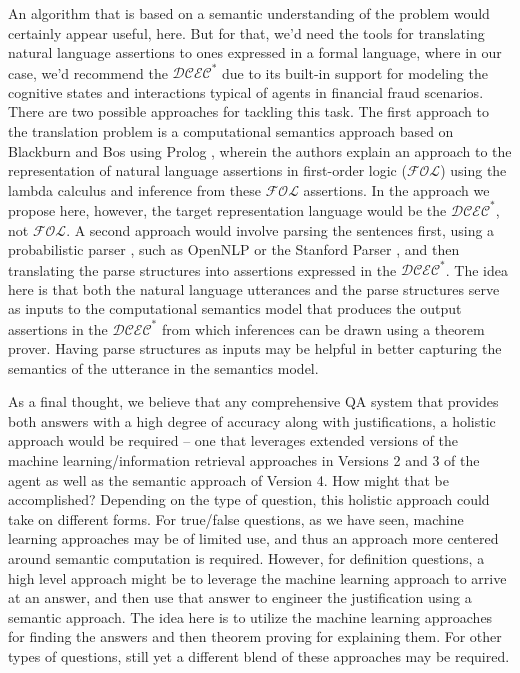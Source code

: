 An algorithm that is based on a semantic understanding of the problem would certainly appear useful, here. But for that, we'd need the tools for translating natural language assertions to ones expressed in a formal language, where in our case, we'd recommend the $\mathcal{DCEC}^\ast$ due to its built-in support for modeling the cognitive states and interactions typical of agents in financial fraud scenarios. There are two possible approaches for tackling this task. The first approach to the translation problem is a computational semantics approach based on Blackburn and Bos \cite{blackburn_2005_representation_ch1, blackburn_2005_representation_ch2, blackburn_2005_representation_ch3, blackburn_2005_representation_ch4, blackburn_2005_representation_ch5, blackburn_2005_representation_ch6} using Prolog \cite{
blackburn_2006_prolog_ch7,
blackburn_2006_prolog_ch8,
blackburn_2006_prolog_ch9,
blackburn_2006_prolog_ch10,
blackburn_2006_prolog_ch11,
blackburn_2006_prolog_ch12}, wherein the authors explain an approach to the representation of natural language assertions in first-order logic ($\mathcal{FOL}$) \cite{blackburn_2005_representation_ch1} using the lambda calculus \cite{blackburn_2005_representation_ch2} and inference \cite{blackburn_2005_representation_ch4, blackburn_2005_representation_ch5} from these $\mathcal{FOL}$ assertions. In the approach we propose here, however, the target representation language would be the $\mathcal{DCEC}^\ast$, not $\mathcal{FOL}$.  A second approach would involve parsing the sentences first, using a probabilistic parser \cite{martin_2000_speech_ch14}, such as OpenNLP \cite{opennlp} or the Stanford Parser \cite{stanford_parser}, and then translating the parse structures into assertions expressed in the $\mathcal{DCEC}^\ast$.  The idea here is that both the natural language utterances and the parse structures serve as inputs to the computational semantics model that produces the output assertions in the $\mathcal{DCEC}^\ast$ from which inferences can be drawn using a theorem prover.  Having parse structures as inputs may be helpful in better capturing the semantics of the utterance in the semantics model. 

As a final thought, we believe that any comprehensive QA system that provides both answers with a high degree of accuracy along with justifications, a holistic approach would be required – one that leverages extended versions of the machine learning/information retrieval approaches in Versions 2 and 3 of the agent as well as the semantic approach of Version 4. How might that be accomplished? Depending on the type of question, this holistic approach could take on different forms. For true/false questions, as we have seen, machine learning approaches may be of limited use, and thus an approach more centered around semantic computation is required.  However, for definition questions, a high level approach might be to leverage the machine learning approach to arrive at an answer, and then use that answer to engineer the justification using a semantic approach.  The idea here is to utilize the machine learning approaches for finding the answers and then theorem proving for explaining them. For other types of questions, still yet a different blend of these approaches may be required.